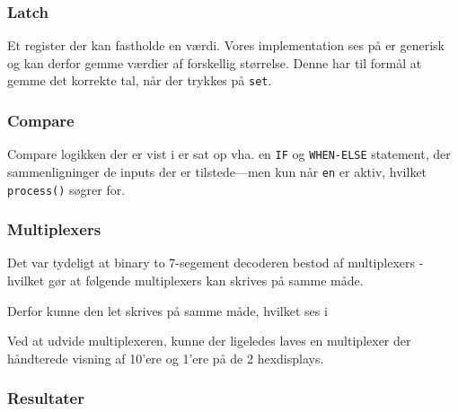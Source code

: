 {    

    \subsubsection*{Latch}
    Et register der kan fastholde en værdi. Vores implementation ses på  er generisk og kan derfor gemme værdier af forskellig størrelse. Denne har til formål at gemme det korrekte tal, når der trykkes på \texttt{set}.


    \subsubsection*{Compare}
    Compare logikken der er vist i  er sat op vha. en \texttt{IF} og \texttt{WHEN-ELSE} statement, der sammenligninger de inputs der er tilstede---men kun når \texttt{en} er aktiv, hvilket \texttt{process()} søgrer for.


    \subsubsection*{Multiplexers}
    Det var tydeligt at binary to 7-segement decoderen bestod af multiplexers - hvilket gør at følgende multiplexers kan skrives på samme måde.

    Derfor kunne den let skrives på samme måde, hvilket ses i 

    Ved at udvide multiplexeren, kunne der ligeledes laves en multiplexer der håndterede visning af 10'ere og 1'ere på de 2 hexdisplays.

    \subsubsection{Resultater}

}
